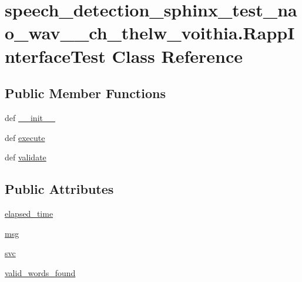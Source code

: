 \hypertarget{classspeech__detection__sphinx__test__nao__wav__1__ch__thelw__voithia_1_1RappInterfaceTest}{\section{speech\-\_\-detection\-\_\-sphinx\-\_\-test\-\_\-nao\-\_\-wav\-\_\-\_\-ch\-\_\-thelw\-\_\-voithia.\-Rapp\-Interface\-Test Class Reference}
\label{classspeech__detection__sphinx__test__nao__wav__1__ch__thelw__voithia_1_1RappInterfaceTest}
}
\subsection*{Public Member Functions}
\begin{DoxyCompactItemize}
\item 
def \hyperlink{classspeech__detection__sphinx__test__nao__wav__1__ch__thelw__voithia_1_1RappInterfaceTest_a1bd0b6f0389c7a1bd06055293d586063}{\-\_\-\-\_\-init\-\_\-\-\_\-}
\item 
def \hyperlink{classspeech__detection__sphinx__test__nao__wav__1__ch__thelw__voithia_1_1RappInterfaceTest_a2a53c327c0825f7316087a40c20c4db6}{execute}
\item 
def \hyperlink{classspeech__detection__sphinx__test__nao__wav__1__ch__thelw__voithia_1_1RappInterfaceTest_a37a8877b9ee90415f3c3278b01794666}{validate}
\end{DoxyCompactItemize}
\subsection*{Public Attributes}
\begin{DoxyCompactItemize}
\item 
\hyperlink{classspeech__detection__sphinx__test__nao__wav__1__ch__thelw__voithia_1_1RappInterfaceTest_ae1120f227bb1636955f1385895168249}{elapsed\-\_\-time}
\item 
\hyperlink{classspeech__detection__sphinx__test__nao__wav__1__ch__thelw__voithia_1_1RappInterfaceTest_ad6e60b13bb74fccfe6866ae5a5679d50}{msg}
\item 
\hyperlink{classspeech__detection__sphinx__test__nao__wav__1__ch__thelw__voithia_1_1RappInterfaceTest_acb185da2a29f69292717c7c447165d72}{svc}
\item 
\hyperlink{classspeech__detection__sphinx__test__nao__wav__1__ch__thelw__voithia_1_1RappInterfaceTest_afd504357193c3c38d8475d5011c160e6}{valid\-\_\-words\-\_\-found}
\end{DoxyCompactItemize}


